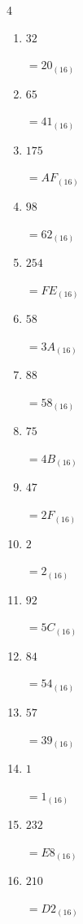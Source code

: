 \begin{multicols}{4}
\begin{enumerate}
  \item $32$

        $=20_{(16)}$

  \item $65$

        $=41_{(16)}$

  \item $175$

        $=AF_{(16)}$

  \item $98$

        $=62_{(16)}$

  \item $254$

        $=FE_{(16)}$

  \item $58$

        $=3A_{(16)}$

  \item $88$

        $=58_{(16)}$

  \item $75$

        $=4B_{(16)}$

  \item $47$

        $=2F_{(16)}$

  \item $2$

        $=2_{(16)}$

  \item $92$

        $=5C_{(16)}$

  \item $84$

        $=54_{(16)}$

  \item $57$

        $=39_{(16)}$

  \item $1$

        $=1_{(16)}$

  \item $232$

        $=E8_{(16)}$

\columnbreak %

\resetques

  \item $210$

        $=D2_{(16)}$


\end{enumerate}
\end{multicols}
